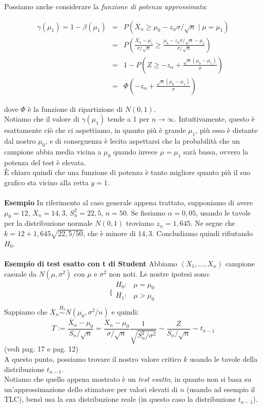 Possiamo anche considerare la \textit{funzione di potenza approssimata}:

\begin{eqnarray}
\gamma(\mu_1) = 1- \beta(\mu_1) 	&=& P(\overline{X}_n \geq \mu_0 - z_{\alpha} \sigma / \sqrt{n} \mid \mu = \mu_1) \nonumber \\
							&=& P \left(\frac{\overline{X}_n-\mu_1}{\sigma / \sqrt{n}} \geq \frac{\mu_0 - z_{\alpha} \sigma / \sqrt{n} - \mu_1}{\sigma / \sqrt{n}} \right) \nonumber \\
							&=& 1-P \left( Z \geq -z_{\alpha} + \frac{\sqrt{n}(\mu_0 - \mu_1)}{\sigma} \right) \nonumber \\
							&=& \Phi \left( -z_{\alpha} + \frac{\sqrt{n}(\mu_0 - \mu_1)}{\sigma} \right) \nonumber
\end{eqnarray}


dove $\Phi$ è la funzione di ripartizione di $N(0,1)$.\\
Notiamo che il valore di $\gamma(\mu_1)$ tende a 1 per $n \rightarrow \infty$. Intuitivamente, questo è esattamente ciò che ci aspettiamo, in quanto più è grande $\mu_1$, più esso è distante dal nostro $\mu_0$, e di conseguenza è lecito aspettarsi che la probabilità che un campione abbia media vicina a $\mu_0$ quando invece $\mu=\mu_1$ sarà bassa, ovvero la potenza del test è elevata.\\
È chiaro quindi che una funzione di potenza è tanto migliore quanto più il suo grafico sta vicino alla retta $y=1$.\\
\\
\textbf{Esempio} In riferimento al caso generale appena trattato, supponiamo di avere $\mu_0=12$, $\overline{X}_n=14,3$, $S_n^2=22,5$, $n=50$. Se fissiamo $\alpha=0,05$, usando le tavole per la distribuzione normale $N(0,1)$ troviamo $z_{\alpha}=1,645$. Ne segue che $k=12+1,645\sqrt{22,5/50}$, che è minore di $14,3$. Concludiamo quindi rifiutando $H_0$.\\
\\
\textbf{Esempio di test esatto con t di Student} Abbiamo $(X_1,...,X_n)$ campione casuale da $N(\mu,\sigma^2)$ con $\mu$ e $\sigma^2$ non noti. Le nostre ipotesi sono:
$$\bigg \{
\begin{array}{rl}
H_0: & \mu=\mu_0 \\
H_1: & \mu>\mu_0 \\
\end{array}
$$
Sappiamo che $\overline{X}_n \stackrel{H_0}{\sim} N(\mu_0,\sigma^2/n)$ e quindi:
$$T:= \frac{\overline{X}_n - \mu_0}{S_n / \sqrt{n}} = \frac{\overline{X}_n - \mu_0}{\sigma / \sqrt{n}} \frac{1}{\sqrt{S_n^2 / \sigma^2}} \sim \frac{Z}{S_n / \sqrt{n}} \sim t_{n-1}$$
(vedi pag. 17 e pag. 12)\\
A questo punto, possiamo trovare il nostro valore critico $k$ usando le tavole della distribuzione $t_{n-1}$.\\
Notiamo che quello appena mostrato è un \textit{test esatto}, in quanto non si basa su un'approssimazione dello stimatore per valori elevati di $n$ (usando ad esempio il TLC), bensì usa la sua distribuzione reale (in questo caso la distribuzione $t_{n-1}$).